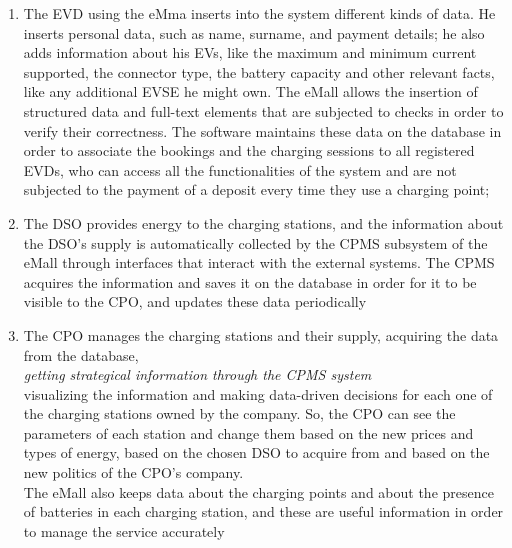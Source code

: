\begin{enumerate}
    \item The EVD using the eMma inserts into the system different kinds of data. He inserts personal data, such as name, surname, and payment details; he also adds information about his EVs, like the maximum and minimum current supported, the connector type, the battery capacity and other relevant facts, like any additional EVSE he might own. The eMall allows the insertion of structured data and full-text elements that are subjected to checks in order to verify their correctness. The software maintains these data on the database in order to associate the bookings and the charging sessions to all registered EVDs, who can access all the functionalities of the system and are not subjected to the payment of a deposit every time they use a charging point;
    \item The DSO provides energy to the charging stations, and the information about the DSO's supply is automatically collected by the CPMS subsystem of the eMall through interfaces that interact with the external systems. The CPMS acquires the information and saves it on the database in order for it to be visible to the CPO, and updates these data periodically 
    \item The CPO manages the charging stations and their supply, acquiring the data from the database, \\
    \textit{getting strategical information through the CPMS system}
    \\
    visualizing the information and making data-driven decisions for each one of the charging stations owned by the company. So, the CPO can see the parameters of each station and change them based on the new prices and types of energy, based on the chosen DSO to acquire from and based on the new politics of the CPO's company. \\
    
    
    The eMall also keeps data about the charging points and about the presence of batteries in each charging station, and these are useful information in order to manage the service accurately
    

\end{enumerate}
